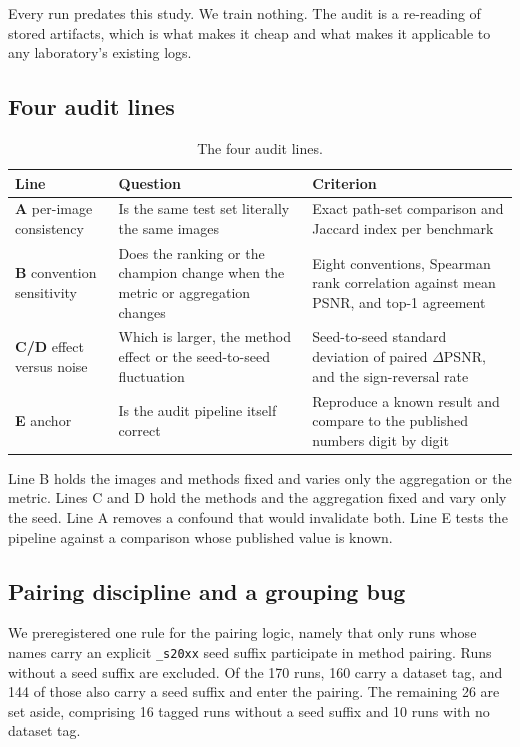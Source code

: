 \documentclass[journal,twoside,10pt]{IEEEtran}
\newlength{\tblavail}
\begin{document}
Every run predates this study. We train nothing. The audit is a re-reading of stored artifacts, which is what makes it cheap and what makes it applicable to any laboratory's existing logs.

\subsection{Four audit lines}


\begin{table}[!t]
\caption{The four audit lines.}
\label{tab:II}
\centering
\small
\setlength{\tabcolsep}{3pt}
\setlength{\tblavail}{\dimexpr\columnwidth-6\tabcolsep\relax}
\begin{tabular}{p{0.165\tblavail}p{0.390\tblavail}p{0.415\tblavail}}
\hline
Line & Question & Criterion \\
\hline
\textbf{A} per-image consistency & Is the same test set literally the same images & Exact path-set comparison and Jaccard index per benchmark \\
\textbf{B} convention sensitivity & Does the ranking or the champion change when the metric or aggregation changes & Eight conventions, Spearman rank correlation against mean PSNR, and top-1 agreement \\
\textbf{C/D} effect versus noise & Which is larger, the method effect or the seed-to-seed fluctuation & Seed-to-seed standard deviation of paired $\Delta$PSNR, and the sign-reversal rate \\
\textbf{E} anchor & Is the audit pipeline itself correct & Reproduce a known result and compare to the published numbers digit by digit \\
\hline
\end{tabular}
\end{table}

Line B holds the images and methods fixed and varies only the aggregation or the metric. Lines C and D hold the methods and the aggregation fixed and vary only the seed. Line A removes a confound that would invalidate both. Line E tests the pipeline against a comparison whose published value is known.

\subsection{Pairing discipline and a grouping bug}


We preregistered one rule for the pairing logic, namely that only runs whose names carry an explicit \texttt{\_s20xx} seed suffix participate in method pairing. Runs without a seed suffix are excluded. Of the 170 runs, 160 carry a dataset tag, and 144 of those also carry a seed suffix and enter the pairing. The remaining 26 are set aside, comprising 16 tagged runs without a seed suffix and 10 runs with no dataset tag.
\end{document}
